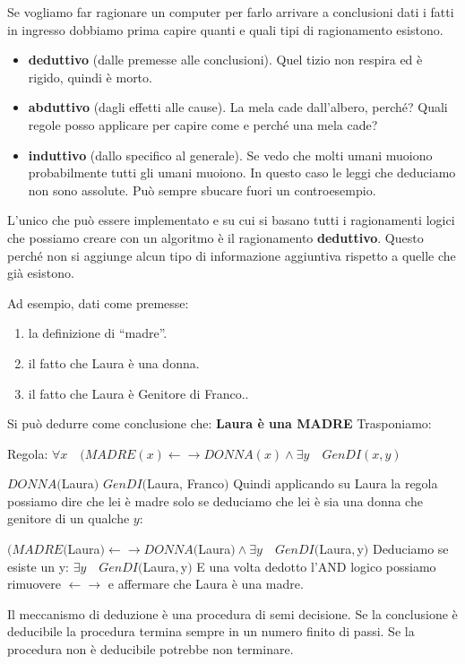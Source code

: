 \noindent Se vogliamo far ragionare un computer per farlo arrivare a conclusioni dati i fatti in ingresso dobbiamo prima capire quanti e quali tipi di ragionamento esistono.
\begin{itemize}
	\item \textbf{deduttivo} (dalle premesse alle conclusioni). Quel tizio non respira ed è rigido, quindi è morto.
	\item \textbf{abduttivo} (dagli effetti alle cause). La mela cade dall'albero, perché? Quali regole posso applicare per capire come e perché una mela cade?
	\item \textbf{induttivo} (dallo specifico al generale). Se vedo che molti umani muoiono probabilmente tutti gli umani muoiono. In questo caso le leggi che deduciamo non sono assolute. Può sempre sbucare fuori un controesempio.
\end{itemize}
L'unico che può essere implementato e su cui si basano tutti i ragionamenti logici che possiamo creare con un algoritmo è il ragionamento \textbf{deduttivo}. Questo perché non si aggiunge alcun tipo di informazione aggiuntiva rispetto a quelle che già esistono.

\begin{info}
	Ad esempio, dati come premesse:
	\begin{enumerate}
		\item la definizione di “madre”.
		\item il fatto che Laura è una donna.
		\item il fatto che Laura è Genitore di Franco..
	\end{enumerate}
	Si può dedurre come conclusione che: \textbf{Laura è una MADRE}\newline\newline
	Trasponiamo:
	
	Regola: $\forall x \quad (MADRE(x) \leftarrow\rightarrow DONNA(x) \land \exists y \quad GenDI(x,y)$
	
	$DONNA($Laura$)$
	$GenDI($Laura, Franco$)$\newline
	Quindi applicando su Laura la regola possiamo dire che lei è madre solo se deduciamo che lei è sia una donna che genitore di un qualche $y$:
	
	$(MADRE($Laura$) \leftarrow\rightarrow DONNA($Laura$) \land \exists y \quad GenDI($Laura$,$y$)$\newline
	Deduciamo se esiste un y:
	$\exists y \quad GenDI($Laura$,$y$)$
	E una volta dedotto l'AND logico possiamo rimuovere $\leftarrow\rightarrow$ e affermare che Laura è una madre.
\end{info}
Il meccanismo di deduzione è una procedura di semi decisione. Se la conclusione è deducibile la procedura termina sempre in un numero finito di passi. Se la procedura non è deducibile potrebbe non terminare.
